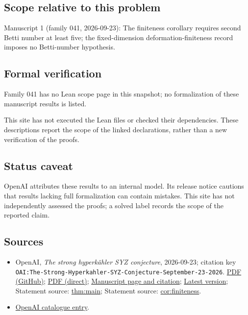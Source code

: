 \documentclass[11pt]{article}
\begin{document}
\subsection{Scope relative to this problem}
Manuscript 1 (family 041, 2026-09-23): The finiteness corollary requires second Betti number at least five; the fixed-dimension deformation-finiteness record imposes no Betti-number hypothesis.

\subsection{Formal verification}
Family 041 has no Lean scope page in this snapshot; no formalization of these manuscript results is listed.

This site has not executed the Lean files or checked their dependencies. These descriptions report the scope of the linked declarations, rather than a new verification of the proofs.

\subsection{Status caveat}
OpenAI attributes these results to an internal model. Its release notice cautions that results lacking full formalization can contain mistakes. This site has not independently assessed the proofs; a solved label records the scope of the reported claim.

\subsection{Sources}
\begin{itemize}
\item OpenAI, \emph{The strong hyperkähler SYZ conjecture}, 2026-09-23; citation key \texttt{OAI:The-Strong-Hyperkahler-SYZ-Conjecture-September-23-2026}. \href{https://github.com/openai/math/blob/adc7f1241b42e322a6451854ab7e4b4c146bf78a/preprints/The-Strong-Hyperkahler-SYZ-Conjecture-September-23-2026/main.pdf}{PDF (GitHub)}; \href{https://github.com/openai/math/raw/adc7f1241b42e322a6451854ab7e4b4c146bf78a/preprints/The-Strong-Hyperkahler-SYZ-Conjecture-September-23-2026/main.pdf}{PDF (direct)}; \href{https://github.com/openai/math/blob/adc7f1241b42e322a6451854ab7e4b4c146bf78a/preprints/The-Strong-Hyperkahler-SYZ-Conjecture-September-23-2026/README.md}{Manuscript page and citation}; \href{https://github.com/openai/math/blob/main/preprints/The-Strong-Hyperkahler-SYZ-Conjecture-September-23-2026/main.pdf}{Latest version}; Statement source: \href{https://github.com/openai/math/blob/adc7f1241b42e322a6451854ab7e4b4c146bf78a/preprints/The-Strong-Hyperkahler-SYZ-Conjecture-September-23-2026/build/sections/introduction.tex\#L25}{thm:main}; Statement source: \href{https://github.com/openai/math/blob/adc7f1241b42e322a6451854ab7e4b4c146bf78a/preprints/The-Strong-Hyperkahler-SYZ-Conjecture-September-23-2026/build/sections/introduction.tex\#L57}{cor:finiteness}.
\item \href{https://github.com/openai/math/blob/adc7f1241b42e322a6451854ab7e4b4c146bf78a/CONTENTS.md}{OpenAI catalogue entry}.
\end{itemize}
\end{document}
